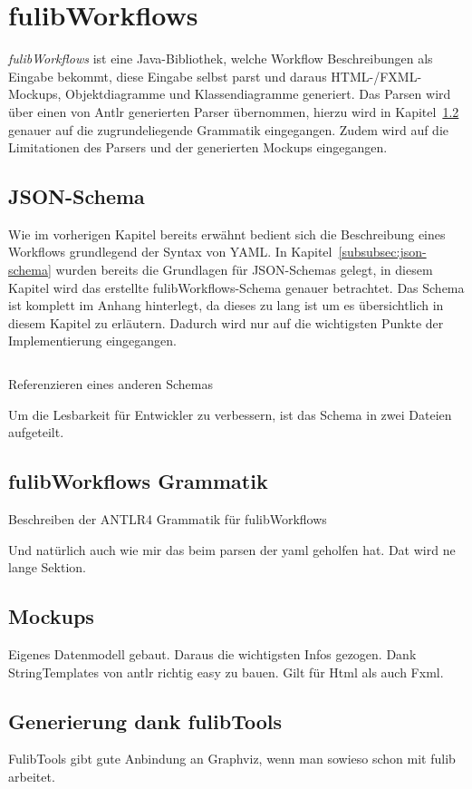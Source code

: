\section{fulibWorkflows}\label{sec:fulibworkflows2}
\textit{fulibWorkflows} ist eine Java-Bibliothek, welche Workflow Beschreibungen als Eingabe bekommt, diese Eingabe
selbst parst und daraus HTML-/FXML-Mockups, Objektdiagramme und Klassendiagramme generiert.
Das Parsen wird über einen von Antlr generierten Parser übernommen, hierzu wird in Kapitel~\ref{subsec:fulibworkflows-grammatik} genauer auf
die zugrundeliegende Grammatik eingegangen.
Zudem wird auf die Limitationen des Parsers und der generierten Mockups eingegangen.



\subsection{JSON-Schema}\label{subsec:schema}
Wie im vorherigen Kapitel bereits erwähnt bedient sich die Beschreibung eines Workflows grundlegend der Syntax von \ac*{YAML}.
In Kapitel~\ref{subsubsec:json-schema} wurden bereits die Grundlagen für JSON-Schemas gelegt, in diesem Kapitel wird das erstellte
fulibWorkflows-Schema genauer betrachtet.
Das Schema ist komplett im Anhang hinterlegt, da dieses zu lang ist um es übersichtlich in diesem Kapitel zu erläutern.
Dadurch wird nur auf die wichtigsten Punkte der Implementierung eingegangen.

\begin{listing}[!ht]
    \inputminted{json}{listings/3.1/page.json}
    \caption{Referenzieren eines anderen Schemas}
    \label{listing:schema-split}
\end{listing}

Um die Lesbarkeit für Entwickler zu verbessern, ist das Schema in zwei Dateien aufgeteilt.


\subsection{fulibWorkflows Grammatik}\label{subsec:fulibworkflows-grammatik}
Beschreiben der ANTLR4 Grammatik für fulibWorkflows

Und natürlich auch wie mir das beim parsen der yaml geholfen hat.
Dat wird ne lange Sektion.

\subsection{Mockups}\label{subsec:mockups}
Eigenes Datenmodell gebaut.
Daraus die wichtigsten Infos gezogen.
Dank StringTemplates von antlr richtig easy zu bauen.
Gilt für Html als auch Fxml.

\subsection{Generierung dank fulibTools}\label{subsec:generierung-dank-fulibtools}
FulibTools gibt gute Anbindung an Graphviz, wenn man sowieso schon mit fulib arbeitet.
